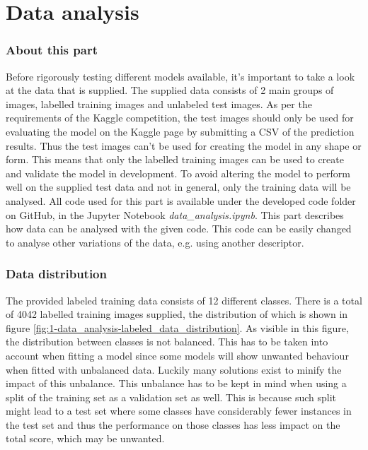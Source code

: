 \part{Data analysis}
\label{part:data_analysis}


\section{About this part}
\label{section:DA_about_part}
Before rigorously testing different models available, it's important to take a look at the data that is supplied. The supplied data consists of 2 main groups of images, labelled training images and unlabeled test images.
As per the requirements of the Kaggle competition, the test images should only be used for evaluating the model on the Kaggle page by submitting a CSV of the prediction results.
Thus the test images can't be used for creating the model in any shape or form.
This means that only the labelled training images can be used to create and validate the model in development.
To avoid altering the model to perform well on the supplied test data and not in general, only the training data will be analysed.
All code used for this part is available under the developed code folder on GitHub, in the Jupyter Notebook \emph{data\_analysis.ipynb}.
This part describes how data can be analysed with the given code.
This code can be easily changed to analyse other variations of the data, e.g. using another descriptor.


\section{Data distribution}
\label{section:DA_data_distribution}
The provided labeled training data consists of 12 different classes.
There is a total of 4042 labelled training images supplied, the distribution of which is shown in figure \ref{fig:1-data_analysis-labeled_data_distribution}.
As visible in this figure, the distribution between classes is not balanced.
This has to be taken into account when fitting a model since some models will show unwanted behaviour when fitted with unbalanced data.
Luckily many solutions exist to minify the impact of this unbalance.
This unbalance has to be kept in mind when using a split of the training set as a validation set as well.
This is because such split might lead to a test set where some classes have considerably fewer instances in the test set and thus the performance on those classes has less impact on the total score, which may be unwanted.



